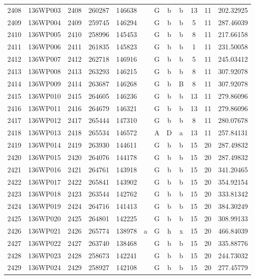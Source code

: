 \begin{tabular}{|*{12}{c|}}
2408 & 136WP003 & 2408 & 260287 & 146638 &  & G & b & b & 13 & 11 & 202.32925 \\ 
2409 & 136WP004 & 2409 & 259745 & 146294 &  & G & b & b & 5 & 11 & 287.46039 \\ 
2410 & 136WP005 & 2410 & 258996 & 145453 &  & G & b & b & 8 & 11 & 217.66158 \\ 
2411 & 136WP006 & 2411 & 261835 & 145823 &  & G & b & b & 1 & 11 & 231.50058 \\ 
2412 & 136WP007 & 2412 & 262718 & 146916 &  & G & b & b & 5 & 11 & 245.03412 \\ 
2413 & 136WP008 & 2413 & 263293 & 146215 &  & G & b & b & 8 & 11 & 307.92078 \\ 
2414 & 136WP009 & 2414 & 263687 & 146268 &  & G & b & B & 8 & 11 & 307.92078 \\ 
2415 & 136WP010 & 2415 & 264605 & 146236 &  & G & b & b & 13 & 11 & 279.86096 \\ 
2416 & 136WP011 & 2416 & 264679 & 146321 &  & G & b & b & 13 & 11 & 279.86096 \\ 
2417 & 136WP012 & 2417 & 265444 & 147310 &  & G & b & b & 8 & 11 & 280.07678 \\ 
2418 & 136WP013 & 2418 & 265534 & 146572 &  & A & D & a & 13 & 11 & 257.84131 \\ 
2419 & 136WP014 & 2419 & 263930 & 144611 &  & G & b & b & 15 & 20 & 287.49832 \\ 
2420 & 136WP015 & 2420 & 264076 & 144178 &  & G & b & b & 15 & 20 & 287.49832 \\ 
2421 & 136WP016 & 2421 & 264761 & 143918 &  & G & b & b & 15 & 20 & 341.20465 \\ 
2422 & 136WP017 & 2422 & 265841 & 143902 &  & G & b & b & 15 & 20 & 354.92154 \\ 
2423 & 136WP018 & 2423 & 263544 & 142762 &  & G & b & b & 15 & 20 & 333.81342 \\ 
2424 & 136WP019 & 2424 & 264716 & 141413 &  & G & b & b & 15 & 20 & 384.30249 \\ 
2425 & 136WP020 & 2425 & 264801 & 142225 &  & G & b & b & 15 & 20 & 308.99133 \\ 
2426 & 136WP021 & 2426 & 265774 & 138978 & a & G & h & x & 15 & 20 & 466.84039 \\ 
2427 & 136WP022 & 2427 & 263740 & 138468 &  & G & b & b & 15 & 20 & 335.88776 \\ 
2428 & 136WP023 & 2428 & 258673 & 142241 &  & G & b & b & 15 & 20 & 244.73032 \\ 
2429 & 136WP024 & 2429 & 258927 & 142108 &  & G & b & b & 15 & 20 & 277.45779 \\ 

\end{tabular}
